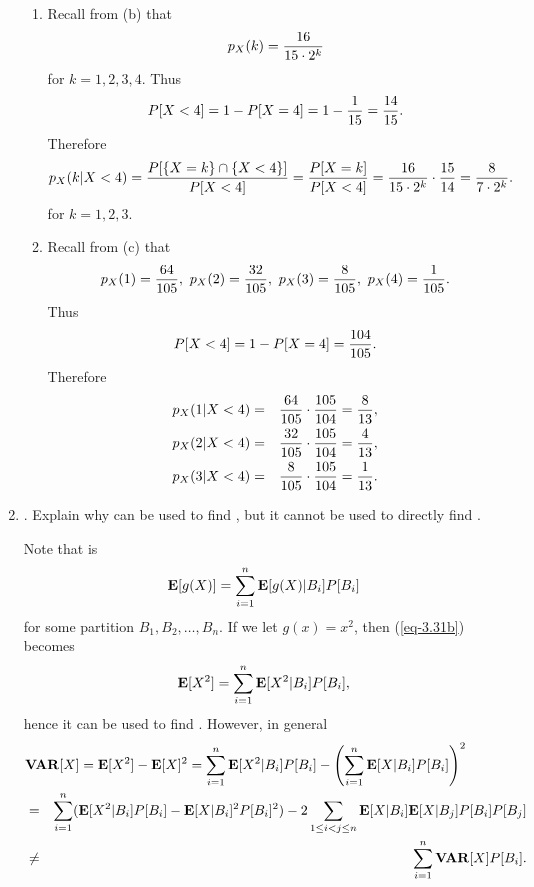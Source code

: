 \begin{enumerate}
\begin{solution}
\begin{enumerate}
		\item Recall from  (b) that
		\[
			p_{X}(k) = \frac{16}{15\cdot 2^k}
		\]
		for $k=1,2,3,4$.
		Thus
		\[
			P[X<4] = 1- P[X=4] = 1-\frac{1}{15} = \frac{14}{15}.
		\]
		Therefore
		\[
			p_{X}(k|X<4) = \frac{P[\{X=k\}\cap \{X<4\}]}{P[X<4]}
			= \frac{P[X=k]}{P[X<4]}
			= \frac{16}{15\cdot 2^k} \cdot \frac{15}{14} = \frac{8}{7\cdot 2^k}.
		\]
		for $k=1,2,3$.

		\item Recall from  (c) that
		\[
			p_{X}(1) = \frac{64}{105},\
			p_{X}(2) = \frac{32}{105},\
			p_{X}(3) = \frac{8}{105},\
			p_{X}(4) = \frac{1}{105}.
		\]
		Thus
		\[
			P[X<4] = 1- P[X=4] = \frac{104}{105}.
		\]
		Therefore
		\begin{eqnarray*}
			p_{X}(1|X<4) &=& \frac{64}{105} \cdot \frac{105}{104} = \frac{8}{13},
			\\p_{X}(2|X<4) &=& \frac{32}{105} \cdot \frac{105}{104} = \frac{4}{13},
			\\p_{X}(3|X<4) &=& \frac{8}{105} \cdot \frac{105}{104} = \frac{1}{13}.
		\end{eqnarray*}

	\end{enumerate}
	\end{solution}
	\fi


	\item {}.
	Explain why  can be used to find ,
	but it cannot be used to directly find .
	\ifdefined\sol
	\begin{solution}
		Note that \lgeq{3.31b} is
		\begin{equation}
		\label{eq-3.31b}
			{\bf E}[g(X)] = \sum_{i=1}^{n} {\bf E}[g(X)|B_i] P[B_i]
		\end{equation}
		for some partition $B_1, B_2, \ldots, B_n$.
		If we let $g(x) = x^2$, then (\ref{eq-3.31b})
		becomes
		\[
			 = \sumiton \cExp{X^2}{B_i} \pr{B_i},
		\]
		hence it can be used to find \Exp{X^2}.
		However,
		in general
		\begin{eqnarray*}
			\lefteqn{
			\VAR{X} = \Exp{X^2} - \Exp{X}^2
			= \sumiton \cExp{X^2}{B_i} \pr{B_i}
			- \left(\sumiton \cExp{X}{B_i} \pr{B_i}  \right)^2
			}
			\\&=&
			\sumiton (\cExp{X^2}{B_i} \pr{B_i} - \cExp{X}{B_i}^2 \pr{B_i}^2)
			- 2 \sum_{1\leq i< j\leq n} \cExp{X}{B_i} \cExp{X}{B_j} \pr{B_i} \pr{B_j}
			\\&\neq&
			\sumiton \VAR{X} \pr{B_i}.
		\end{eqnarray*}
	\end{solution}
	\fi


\end{enumerate}

